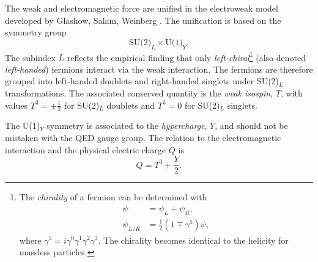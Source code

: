The weak and electromagnetic force are unified in the electroweak model developed by Glashow, Salam, Weinberg .  
The unification is based on the symmetry group
\begin{equation}
  \text{SU(2)}_L \times \text{U(1)}_Y.
\end{equation}
The subindex $L$ reflects the empirical finding that only \emph{left-chiral}\footnote{
  The \emph{chirality} of a fermion can be determined with
  \begin{align}
    \psi &= \psi_L + \psi_R,  \\
    \psi_{L/R} &= \frac{1}{2} \left( 1 \mp \gamma^5 \right) \psi, 
  \end{align}
  where $\gamma^5 = i\gamma^0\gamma^1\gamma^2\gamma^3$. The chirality becomes identical to the helicity for massless particles. 
} (also denoted \emph{left-handed}) fermions interact via the weak interaction. 
The fermions are therefore grouped into left-handed doublets and right-handed singlets under SU(2)$_L$ transformations.
The associated conserved quantity is the \emph{weak isospin}, $T$, with values $T^3 = \pm \frac{1}{2}$ for SU(2)$_L$ doublets and $T^3 = 0$ for SU(2)$_L$ singlets.

The U(1)$_Y$ symmetry is associated to the \emph{hypercharge}, $Y$, and should not be mistaken with the QED gauge group.
The relation to the electromagnetic interaction and the physical electric charge $Q$ is
\begin{equation}
  Q = T^3 + \frac{Y}{2}.
\end{equation}

